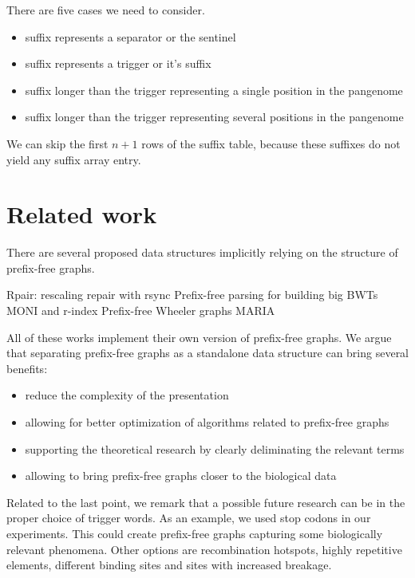 \documentclass[twocolumn]{ceurart}
\begin{document}
There are five cases we need to consider.
\begin{itemize}
    \item suffix represents a separator or the sentinel
    \item suffix represents a trigger or it's suffix
    \item suffix longer than the trigger representing a single position in the pangenome
    \item suffix longer than the trigger representing several positions in the pangenome
\end{itemize}

We can skip the first $n+1$ rows of the suffix table, because these suffixes
do not yield any suffix array entry.

\section{Related work}
There are several proposed data structures implicitly relying on the structure
of prefix-free graphs.

Rpair: rescaling repair with rsync \cite{2019gagie}
Prefix-free parsing for building big BWTs \cite{2019boucher}
MONI and r-index \cite{}
Prefix-free Wheeler graphs \cite{2022pfwg}
MARIA \cite{2022maria}

All of these works implement their own version of prefix-free graphs.
We argue that separating prefix-free graphs as a standalone data structure can
bring several benefits:

\begin{itemize}
    \item reduce the complexity of the presentation
    \item allowing for better optimization of algorithms related to prefix-free graphs
    \item supporting the theoretical research by clearly deliminating the relevant terms
    \item allowing to bring prefix-free graphs closer to the biological data
\end{itemize}

Related to the last point, we remark that a possible future research can be in
the proper choice of trigger words.
As an example, we used stop codons in our experiments.
This could create prefix-free graphs capturing some biologically relevant phenomena.
Other options are recombination hotspots, highly repetitive elements, different
binding sites and sites with increased breakage.
\end{document}
